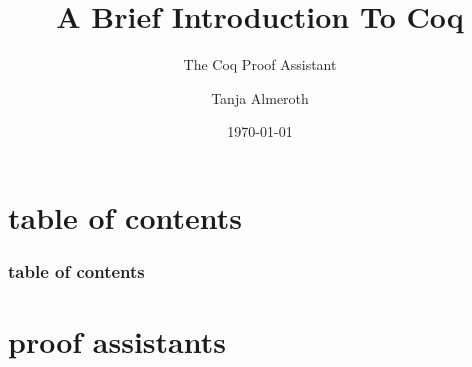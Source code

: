 \documentclass{beamer}
\title{A Brief Introduction To Coq}
\subtitle{The Coq Proof Assistant}
\author{Tanja Almeroth}
\institute{Studienbereich DCSM\\Hochschule {\Medium RheinMain}}
\date{\today}
\begin{document}
	
	\maketitle
		
	\section*{table of contents}
	
		\begin{frame}
			\frametitle{table of contents}
			\tableofcontents[hideallsubsections]
		\end{frame}
	
	


	\section{proof assistants}
	
\end{document}
